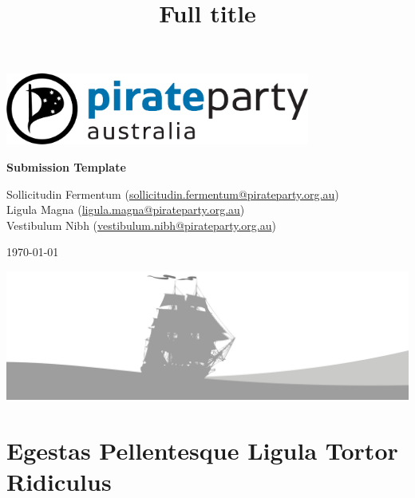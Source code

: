 \documentclass[a4paper,11pt]{article}
\title{Full title}
\begin{document}

\begin{center}

\vspace*{0.5in} 

\includegraphics[width=0.75\textwidth]{logo}

\vspace{1in}

\huge{%
\textbf{%
Submission Template} 
} 

\vfill

\onehalfspacing

\large{%
  Sollicitudin Fermentum
  (\href{mailto:sollicitudin.fermentum@pirateparty.org.au}%
  {sollicitudin.fermentum@pirateparty.org.au})\\
  Ligula Magna
  (\href{mailto:ligula.magna@pirateparty.org.au}%
  {ligula.magna@pirateparty.org.au})\\
  Vestibulum Nibh
  (\href{mailto:vestibulum.nibh@pirateparty.org.au}%
  {vestibulum.nibh@pirateparty.org.au})

\vspace{0.5in}       

\today
}

\vfill

\hspace*{-1.25in}\includegraphics[width=1.1\paperwidth]{boat-branding}

\end{center}

\newpage

\restoregeometry

\onehalfspacing

\tableofcontents

\newpage

\section{Egestas Pellentesque Ligula Tortor Ridiculus}
\end{document}

